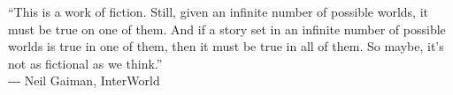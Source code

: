 %
%

\newpage\null\thispagestyle{empty}\newpage


\newpage\null\thispagestyle{empty}\newpage

\vspace*{\fill} \hspace{-3.2em}“This is a work of fiction. Still, given an infinite number of possible
worlds, it must be true on one of them. And if a story set in an infinite number of possible worlds
is true in one of them, then it must be true in all of them. So maybe, it's not as fictional as we
think.”\\
\hspace*{0pt}\hfill ― Neil Gaiman, InterWorld
\vspace*{\fill}

\newpage\null\thispagestyle{empty}\newpage